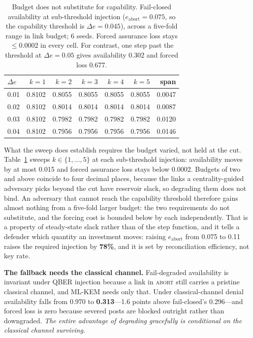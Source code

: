 \documentclass[conference]{IEEEtran}
\begin{document}
\begin{table}[t]
\caption{Budget does not substitute for capability. Fail-closed availability at
sub-threshold injection ($e_{\mathrm{abort}}=0.075$, so the capability threshold is
$\Delta e = 0.045$), across a five-fold range in link budget; 6 seeds. Forced
assurance loss stays $\le0.0002$ in every cell. For contrast, one step past the
threshold at $\Delta e=0.05$ gives availability 0.302 and forced loss 0.677.}
\label{tab:envelope}
\centering\footnotesize
\setlength{\tabcolsep}{4pt}
\begin{tabular}{@{}lrrrrrr@{}}
\toprule
$\Delta e$ & $k{=}1$ & $k{=}2$ & $k{=}3$ & $k{=}4$ & $k{=}5$ & span\\
\midrule
0.01 & 0.8102 & 0.8055 & 0.8055 & 0.8055 & 0.8055 & 0.0047\\
0.02 & 0.8102 & 0.8014 & 0.8014 & 0.8014 & 0.8014 & 0.0087\\
0.03 & 0.8102 & 0.7982 & 0.7982 & 0.7982 & 0.7982 & 0.0120\\
0.04 & 0.8102 & 0.7956 & 0.7956 & 0.7956 & 0.7956 & 0.0146\\
\bottomrule
\end{tabular}
\end{table}

What the sweep does establish requires the budget varied, not held at the cut.
Table~\ref{tab:envelope} sweeps $k \in \{1,\dots,5\}$ at each sub-threshold
injection: availability moves by at most 0.015 and forced assurance loss stays below
0.0002. Budgets of two and above coincide to four decimal places, because the links a
centrality-guided adversary picks beyond the cut have reservoir slack, so degrading
them does not bind. An adversary that cannot reach the capability threshold therefore
gains almost nothing from a five-fold larger budget: the two requirements do not
substitute, and the forcing cost is bounded below by each independently. That is a
property of steady-state slack rather than of the step function, and it tells a
defender which quantity an investment moves: raising $e_{\mathrm{abort}}$ from
0.075 to 0.11 raises the required injection by \textbf{78\%}, and it is set by
reconciliation efficiency, not key rate.

\textbf{The fallback needs the classical channel.} Fail-degraded availability is
invariant under QBER injection because a link in \textsc{abort} still carries a
pristine classical channel, and ML-KEM needs only that. Under classical-channel
denial availability falls from 0.970 to \textbf{0.313}---1.6 points above
fail-closed's 0.296---and forced loss is zero because severed posts are blocked
outright rather than downgraded. \emph{The entire advantage of degrading gracefully
is conditional on the classical channel surviving.}
\end{document}
